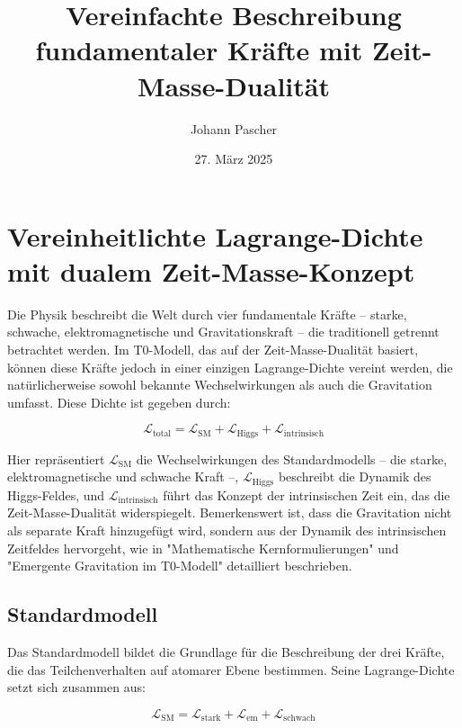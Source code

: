 \documentclass[a4paper,12pt]{article}
\title{Vereinfachte Beschreibung fundamentaler Kräfte mit Zeit-Masse-Dualität}
\author{Johann Pascher}
\date{27. März 2025}
\begin{document}
	
	\maketitle
	
	\tableofcontents
	\newpage
	
	\section{Vereinheitlichte Lagrange-Dichte mit dualem Zeit-Masse-Konzept}
	
	Die Physik beschreibt die Welt durch vier fundamentale Kräfte – starke, schwache, elektromagnetische und Gravitationskraft – die traditionell getrennt betrachtet werden. Im T0-Modell, das auf der Zeit-Masse-Dualität basiert, können diese Kräfte jedoch in einer einzigen Lagrange-Dichte vereint werden, die natürlicherweise sowohl bekannte Wechselwirkungen als auch die Gravitation umfasst. Diese Dichte ist gegeben durch:
	
	\begin{equation}
		\mathcal{L}_\text{total} = \mathcal{L}_\text{SM} + \mathcal{L}_\text{Higgs} + \mathcal{L}_\text{intrinsisch}
	\end{equation}
	
	Hier repräsentiert \(\mathcal{L}_\text{SM}\) die Wechselwirkungen des Standardmodells – die starke, elektromagnetische und schwache Kraft –, \(\mathcal{L}_\text{Higgs}\) beschreibt die Dynamik des Higgs-Feldes, und \(\mathcal{L}_\text{intrinsisch}\) führt das Konzept der intrinsischen Zeit ein, das die Zeit-Masse-Dualität widerspiegelt. Bemerkenswert ist, dass die Gravitation nicht als separate Kraft hinzugefügt wird, sondern aus der Dynamik des intrinsischen Zeitfeldes hervorgeht, wie in "Mathematische Kernformulierungen" \cite{pascher_lagrange_2025} und "Emergente Gravitation im T0-Modell" \cite{pascher_emergente_gravitation_2025} detailliert beschrieben.
	
	\subsection{Standardmodell}
	
	Das Standardmodell bildet die Grundlage für die Beschreibung der drei Kräfte, die das Teilchenverhalten auf atomarer Ebene bestimmen. Seine Lagrange-Dichte setzt sich zusammen aus:
	
	\begin{equation}
		\mathcal{L}_\text{SM} = \mathcal{L}_\text{stark} + \mathcal{L}_\text{em} + \mathcal{L}_\text{schwach}
	\end{equation}
	
\end{document}
